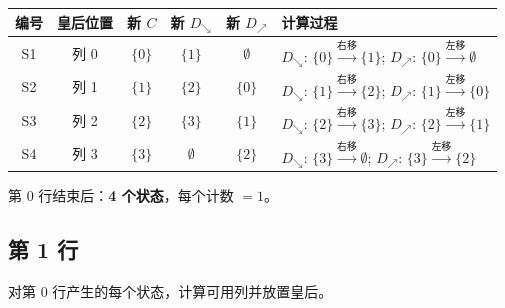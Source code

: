 \documentclass[12pt,a4paper]{article}
\begin{document}
\begin{center}
\renewcommand{\arraystretch}{1.4}
\begin{tabular}{c|c|c|c|c|l}
\toprule
编号 & 皇后位置 & 新 $C$ & 新 $D_\searrow$ & 新 $D_\nearrow$ & 计算过程 \\
\midrule
S1 & 列 0 & $\{0\}$ & $\{1\}$ & $\emptyset$ & $D_\searrow$: $\{0\} \xrightarrow{\text{右移}} \{1\}$; $D_\nearrow$: $\{0\} \xrightarrow{\text{左移}} \emptyset$ \\
S2 & 列 1 & $\{1\}$ & $\{2\}$ & $\{0\}$ & $D_\searrow$: $\{1\} \xrightarrow{\text{右移}} \{2\}$; $D_\nearrow$: $\{1\} \xrightarrow{\text{左移}} \{0\}$ \\
S3 & 列 2 & $\{2\}$ & $\{3\}$ & $\{1\}$ & $D_\searrow$: $\{2\} \xrightarrow{\text{右移}} \{3\}$; $D_\nearrow$: $\{2\} \xrightarrow{\text{左移}} \{1\}$ \\
S4 & 列 3 & $\{3\}$ & $\emptyset$ & $\{2\}$ & $D_\searrow$: $\{3\} \xrightarrow{\text{右移}} \emptyset$; $D_\nearrow$: $\{3\} \xrightarrow{\text{左移}} \{2\}$ \\
\bottomrule
\end{tabular}
\end{center}

\begin{center}
\end{center}

第 0 行结束后：\textbf{4 个状态}，每个计数 $= 1$。

\subsection{第 1 行}

对第 0 行产生的每个状态，计算可用列并放置皇后。
\end{document}
